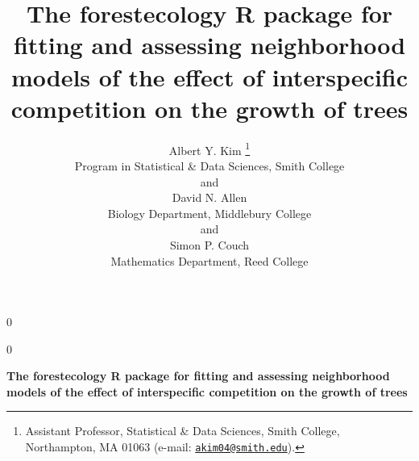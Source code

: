 \documentclass[12pt]{article}
\newcommand{\blind}{0}
\begin{document}
\def\spacingset#1{\renewcommand{\baselinestretch}%
{#1}\small\normalsize} \spacingset{1}



\blind
{
  \title{\bf The forestecology R package for fitting and assessing neighborhood
models of the effect of interspecific competition on the growth of trees}

  \author{
        Albert Y. Kim \thanks{Assistant Professor, Statistical \& Data Sciences, Smith College,
Northampton, MA 01063 (e-mail:
\href{mailto:akim04@smith.edu}{\nolinkurl{akim04@smith.edu}}).} \\
    Program in Statistical \& Data Sciences, Smith College\\
     and \\     David N. Allen \\
    Biology Department, Middlebury College\\
     and \\     Simon P. Couch \\
    Mathematics Department, Reed College\\
      }
  \maketitle
} \fi

\blind
{
  \bigskip
  \bigskip
  \bigskip
  \begin{center}
    {\LARGE\bf The forestecology R package for fitting and assessing neighborhood
models of the effect of interspecific competition on the growth of trees}
  \end{center}
  \medskip
} \fi
\end{document}
